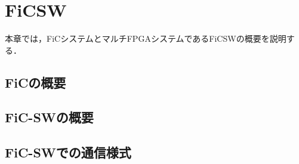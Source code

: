 \chapter{FiCSW}
{
\label{chap:ficsw}
本章では，FiCシステムとマルチFPGAシステムであるFiCSWの概要を説明する．

\section{FiCの概要}
\label{sec:about_fic}

\section{FiC-SWの概要}
\label{sec:about_ficsw}

\section{FiC-SWでの通信様式}
\label{sec:ficsw_communication}
}
